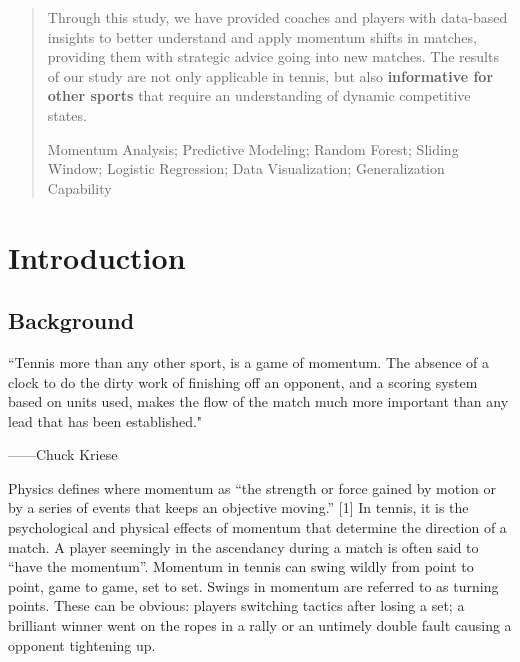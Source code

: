 \documentclass{mcmthesis}
\begin{document}
\begin{abstract}
Through this study, we have provided coaches and players with data-based insights to better
understand and apply momentum shifts in matches, providing them with strategic advice going
into new matches. The results of our study are not only applicable in tennis, but also {\bf informative
for other sports} that require an understanding of dynamic competitive states.

\begin{keywords}

Momentum Analysis; Predictive Modeling; Random Forest; Sliding Window; Logistic Regression;
Data Visualization; Generalization Capability
\end{keywords}

\end{abstract}

\maketitle

\tableofcontents        
\thispagestyle{empty}

\newpage

\section{Introduction}

\subsection{Background}

“Tennis more than any other sport, is a game of momentum. The absence of a clock to do the dirty
work of finishing off an opponent, and a scoring system based on units used, makes the flow of the
match much more important than any lead that has been established." 

——Chuck Kriese

    Physics defines where momentum as “the strength or force gained by motion or by a series of
events that keeps an objective moving.” [1] In tennis, it is the psychological and physical effects
of momentum that determine the direction of a match. A player seemingly in the ascendancy
during a match is often said to “have the momentum”. Momentum in tennis can swing wildly from
point to point, game to game, set to set. Swings in momentum are referred to as turning points. These can be obvious: players switching tactics after losing a set; a brilliant winner went on the
ropes in a rally or an untimely double fault causing a opponent tightening up. 
\end{document}
